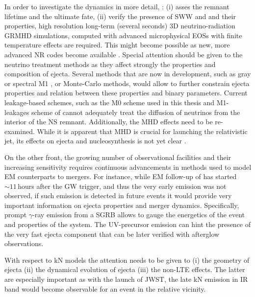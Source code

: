 In order to investigate the \pmerg{} dynamics in more detail, \eg: 
(i) asses the remnant lifetime and the ultimate fate, 
(ii) verify the presence of \ac{SWW} and \nwind{} and their properties, 
high resolution long-term (several seconds) $3$D neutrino-radiation \ac{GRMHD} 
simulations, computed with advanced microphysical \acp{EOS} with finite temperature effects 
are required.
This might become possible as new, more advanced \ac{NR} codes become available 
\citep[\eg][]{Daszuta:2021ecf}.
Special attention should be given to the neutrino treatment methods as they affect strongly the 
properties and composition of ejecta.
Several methods that are now in development, such as gray or spectral M1 \citep{Foucart:2016rxm,Roberts:2016lzn},
or Monte-Carlo methods, would allow to further constrain ejecta 
properties and relation between these properties and binary parameters.
%
Current leakage-based schemes, such as 
the M0 scheme used in this thesis and M1-leakages scheme of \citet{Sekiguchi:2015dma,Fujibayashi:2017puw}
cannot adequately treat the diffusion of neutrinos from the interior of the
\pmerg{} \ac{NS} remnant.
Additionally, the \ac{MHD} effects need to be re-examined. While it is 
apparent that \ac{MHD} is crucial for launching the relativistic jet, its effects on 
ejecta and nucleosynthesis is not yet clear \citep{Siegel:2017jug, Fernandez:2018kax}.

On the other front, the growing number of observational facilities and their increasing 
sensitivity requires continuous advancements in methods used to 
model \ac{EM} counterparts to mergers.
%
For instance, while \ac{EM} follow-up of \GW{} has started ${\sim}11\,$hours after the 
\ac{GW} trigger, and thus the very early emission was not observed, 
if such emission is detected in future events it would provide very 
important information on ejecta properties and merger dynamics. 
%
Specifically, prompt $\gamma$-ray emission from a \ac{SGRB} allows to 
gauge the energetics of the event and properties of the system.
The \ac{UV}-precursor emission can hint the presence of the very 
fast ejecta component that can be later verified with afterglow observations. 


With respect to \ac{kN} models the attention needs to be given to 
(i) the geometry of ejecta 
(ii) the dynamical evolution of ejecta 
(iii) the non-\ac{LTE} effects.
%
The latter are especially important as with the launch of \ac{JWST}, 
the late \ac{kN} emission in \ac{IR} band would become observable for an event in the 
relative vicinity.


